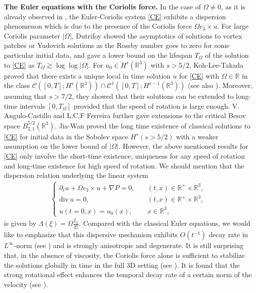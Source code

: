 \documentclass[12pt]{article}
\newcommand{\pa}{\partial}
\newcommand{\R}{\mathbb{R}}
\begin{document}
{\bf The Euler equations with the Coriolis force.}\;
In the case of $\Omega\neq0$, as it is already observed in \cite{ch1,ch2,d}, the Euler-Coriolis system \eqref{CE} exhibits a dispersion phenomenon which is due to the presence of the Coriolis force $\Omega e_3\times u$. For large Coriolis parameter $|\Omega|$, Dutrifoy \cite{d} showed the asymptotics of solutions to vortex
patches or Yudovich solutions as the Rossby number goes to zero for some particular initial data,
and gave a lower bound on the lifespan $T_\Omega$ of the solution to \eqref{CE} as $T_\Omega\gtrsim \log\log|\Omega|$. For $u_0 \in H^s(\mathbb{R}^3)$ with $s>5/2$, Koh-Lee-Takada \cite{KLT} proved that there exists a unique local in time solution $u$ for \eqref{CE} with $\Omega\in\R$ in the class $\mathcal{C}([0, T]; H^s(\mathbb{R}^3)) \cap \mathcal{C}^1([0, T] ; H^{s-1}(\mathbb{R}^3))$ (see also \cite{T,WC}). Moreover, assuming that $s>7/2$, they showed that their solutions can be extended to long-time intervals $\left[0, T_{\Omega}\right]$ provided that the speed of rotation is large enough. V. Angulo-Castillo and L.C.F Ferreira \cite{CF} further gave extensions to the critical Besov space $B^{5/2}_{2,1}(\R^3)$. Jia-Wan \cite{JW} proved the long time existence of classical solutions to \eqref{CE} for initial data in the
Sobolev space $H^s(s > 5/2)$  with a weaker assumption on the lower bound of $|\Omega|$. However, the above mentioned results for \eqref{CE} only involve the short-time existence, uniqueness for any speed of rotation and long-time existence for high speed of rotation.
We should mention that the dispersion relation underlying the linear system
\begin{align*}
\begin{cases}
\pa_t u+\Omega e_3\times u+\nabla P=0, &\quad (t,x)\in \R^+\times\R^3,\\
\mathrm{div\,} u=0,&\quad (t,x)\in \R^+\times\R^3,\\
u(t=0,x)=u_0(x), &\quad x\in \R^3,
\end{cases}
\end{align*}
is given by
$
\Lambda(\xi)=\Omega\frac{\xi_3}{|\xi|}
$.
Compared with the classical Euler equations, we would like to emphasize that this dispersive mechanism exhibits $O(t^{-1})$ decay rate in $L^{\infty}$-norm (see \cite{R}) and is strongly anisotropic and degenerate. It is still surprising that, in the absence of viscosity, the Coriolis force alone is sufficient to stabilize the solutions globally in time in the full 3D setting (see \cite{YGUO}). It is found that the strong rotational effect enhances the temporal decay rate of a certain norm of
the velocity (see \cite{AKL}).
\end{document}
